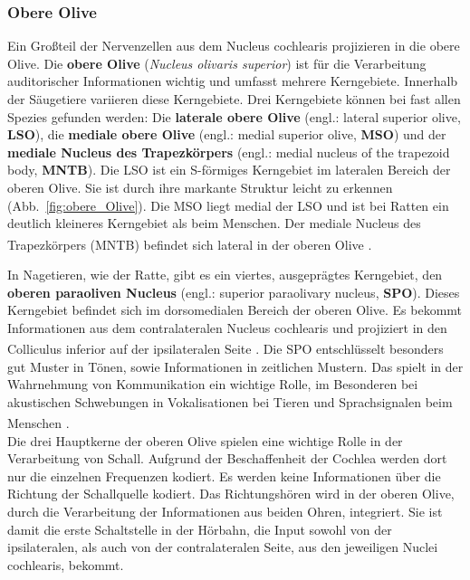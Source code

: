 \documentclass[12pt,a4paper,pdftex]{article}
\begin{document}
\subsubsection*{Obere Olive}
Ein Großteil der Nervenzellen aus dem Nucleus cochlearis projizieren in die obere Olive. Die \textbf{obere Olive} (\textit{Nucleus olivaris superior}) ist für die Verarbeitung auditorischer Informationen wichtig und umfasst mehrere Kerngebiete. Innerhalb der Säugetiere variieren diese Kerngebiete. Drei Kerngebiete können bei fast allen Spezies gefunden werden: Die \textbf{laterale obere Olive} (engl.: lateral superior olive, \textbf{LSO}), die \textbf{mediale obere Olive} (engl.: medial superior olive, \textbf{MSO}) und der \textbf{mediale Nucleus des Trapezkörpers} (engl.: medial nucleus of the trapezoid body, \textbf{MNTB}). Die LSO ist ein S-förmiges Kerngebiet im lateralen Bereich der oberen Olive. Sie ist durch ihre markante Struktur leicht zu erkennen (Abb.~\ref{fig:obere_Olive}). Die MSO liegt medial der LSO und ist bei Ratten ein deutlich kleineres Kerngebiet als beim Menschen. Der mediale Nucleus des Trapezkörpers (MNTB) befindet sich lateral in der oberen Olive \textsuperscript{\cite[29]{paxinos2014rat}}.

In Nagetieren, wie der Ratte, gibt es ein viertes, ausgeprägtes Kerngebiet, den \textbf{oberen paraoliven Nucleus} (engl.: superior paraolivary nucleus, \textbf{SPO}). Dieses Kerngebiet befindet sich im dorsomedialen Bereich der oberen Olive. Es bekommt Informationen aus dem contralateralen Nucleus cochlearis und projiziert in den Colliculus inferior auf der ipsilateralen Seite \textsuperscript{\cite[29]{paxinos2014rat}}. Die SPO entschlüsselt besonders gut Muster in Tönen, sowie Informationen in zeitlichen Mustern. Das spielt in der Wahrnehmung von Kommunikation ein wichtige Rolle, im Besonderen bei akustischen Schwebungen in Vokalisationen bei Tieren und Sprachsignalen beim Menschen \textsuperscript{\cite[29]{paxinos2014rat}}. 
\\

\noindent Die drei Hauptkerne der oberen Olive spielen eine wichtige Rolle in der Verarbeitung von Schall. Aufgrund der Beschaffenheit der Cochlea werden dort nur die einzelnen Frequenzen kodiert. Es werden keine Informationen über die Richtung der Schallquelle kodiert. Das Richtungshören wird in der oberen Olive, durch die Verarbeitung der Informationen aus beiden Ohren, integriert. Sie ist damit die erste Schaltstelle in der Hörbahn, die Input sowohl von der ipsilateralen, als auch von der contralateralen Seite, aus den jeweiligen Nuclei cochlearis, bekommt.
\\
\end{document}
